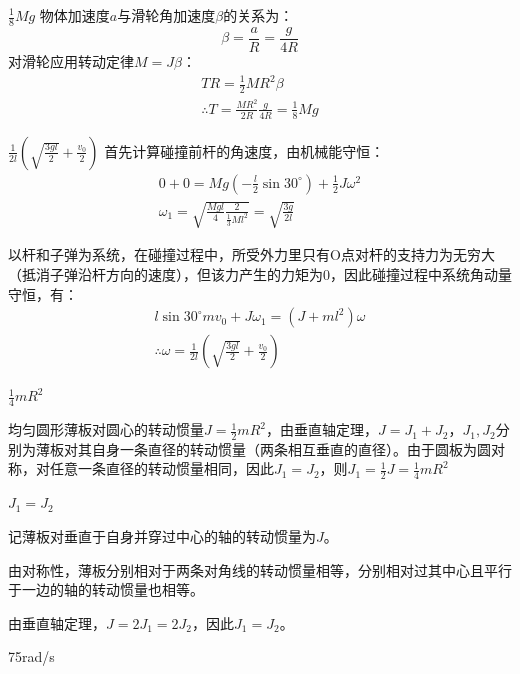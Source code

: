 \documentclass[b5paper,opensource,sourcefont,parskip]{qyxf-book}
\begin{document}
$\frac{1}{8}Mg$
物体加速度$ a $与滑轮角加速度$ \beta $的关系为：
\[\beta=\frac{a}{R}=\frac{g}{4R}\]
对滑轮应用转动定律$M=J\beta$：
\begin{gather*}
TR=\frac{1}{2}MR^2\beta\\
\therefore T=\frac{MR^2}{2R}\frac{g}{4R}=\frac{1}{8}Mg
\end{gather*}

$\frac{1}{2l}\left(\sqrt{\frac{3gl}{2}}+\frac{v_0}{2}\right)$
首先计算碰撞前杆的角速度，由机械能守恒：
\begin{gather*}
0+0=Mg(-\frac{l}{2}\sin 30^\circ)+\frac{1}{2}J\omega^2\\
\omega_1=\sqrt{\frac{Mgl}{4}\frac{2}{\frac{1}{3}Ml^2}}=\sqrt{\frac{3g}{2l}}
\end{gather*}

以杆和子弹为系统，在碰撞过程中，所受外力里只有O点对杆的支持力为无穷大（抵消子弹沿杆方向的速度），但该力产生的力矩为0，因此碰撞过程中系统角动量守恒，有：
\begin{gather*}
l\sin 30^\circ mv_0+J\omega_1=(J+ml^2)\omega\\
\therefore \omega=\frac{1}{2l}\left(\sqrt{\frac{3gl}{2}}+\frac{v_0}{2}\right)
\end{gather*}

$\frac{1}{4}mR^2$

均匀圆形薄板对圆心的转动惯量$ J=\frac{1}{2}mR^2 $，由垂直轴定理，$ J=J_1+J_2 $，$ J_1,J_2 $分别为薄板对其自身一条直径的转动惯量（两条相互垂直的直径）。由于圆板为圆对称，对任意一条直径的转动惯量相同，因此$ J_1=J_2 $，则$ J_1=\frac{1}{2}J=\frac{1}{4}mR^2 $

$J_1=J_2$

记薄板对垂直于自身并穿过中心的轴的转动惯量为$ J $。

由对称性，薄板分别相对于两条对角线的转动惯量相等，分别相对过其中心且平行于一边的轴的转动惯量也相等。


由垂直轴定理，$ J=2J_1=2J_2 $，因此$ J_1=J_2 $。

75rad/s
\end{document}
